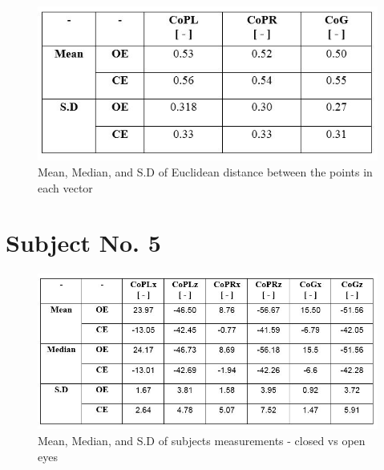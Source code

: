 \documentclass[twoside]{ctuthesis}
\theoremstyle{plain}
\theoremstyle{definition}
\theoremstyle{note}
\begin{document}
\begin{figure}[H]
	\centering
	\includegraphics[width = .8\textwidth]{Patient4DistTable}
	\begin{table}[H]
		\caption{Mean, Median, and S.D of Euclidean distance between the points in each vector}
	\end{table}
\end{figure}

\section{Subject No. 5}

\begin{figure}[H]
	\centering
	\includegraphics[width = \textwidth]{Patient5DataTable}
	\begin{table}[H]
		\caption{Mean, Median, and S.D of subjects measurements - closed vs open eyes}
	\end{table}
\end{figure}
\end{document}
